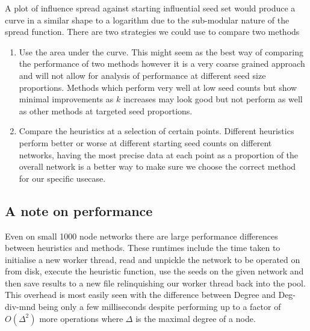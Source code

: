\documentclass{article}
\begin{document}
A plot of influence spread against starting influential seed set would produce a curve in a similar shape to a logarithm due to the sub-modular nature of the spread function.
There are two strategies we could use to compare two methods
\begin{enumerate}
	\item Use the area under the curve. This might seem as the best way of comparing the performance of two methods however it is a very coarse grained approach and will not allow for analysis of performance at different seed size proportions. Methods which perform very well at low seed counts but show minimal improvements as $k$ increases may look good but not perform as well as other methods at targeted seed proportions.
	\item Compare the heuristics at a selection of certain points. Different heuristics perform better or worse at different starting seed counts on different networks, having the most precise data at each point as a proportion of the overall network is a better way to make sure we choose the correct method for our specific usecase.
\end{enumerate}

\subsection{A note on performance}
Even on small 1000 node networks there are large performance differences between heuristics and methods.
These runtimes include the time taken to initialise a new worker thread, read and unpickle the network to be operated on from disk, execute the heuristic function, use the seeds on the given network and then save results to a new file relinquishing our worker thread back into the pool.
This overhead is most easily seen with the difference between Degree and Deg-div-mnd being only a few milliseconds despite performing up to a factor of $O(\Delta ^ 2)$ more operations where $\Delta$ is the maximal degree of a node.
\end{document}
